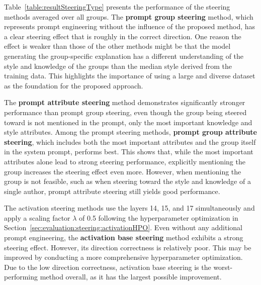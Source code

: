 Table~\ref{table:resultSteeringType} presents the performance of the steering methods averaged over all groups. The \textbf{prompt group steering} method, which represents prompt engineering without the influence of the proposed method, has a clear steering effect that is roughly in the correct direction. One reason the effect is weaker than those of the other methods might be that the model generating the group-specific explanation has a different understanding of the style and knowledge of the groups than the median style derived from the training data. This highlights the importance of using a large and diverse dataset as the foundation for the proposed approach.

\begin{table}[ht]
  \caption[]{This table shows the performance of different steering methods using the metrics displayed in Figure~\ref{fig:steeringMetrics}. The possible steering effect is not used in this experiment, because it would be the same for all methods as the values are averages over all groups. The experiment demonstrates that mentioning the attributes in the system prompt improves steering performance significantly. %
    Additionally, the experiment demonstrates that the newly proposed activation-based steering methods (see Section~\ref{sec:approach:steering:activation}) lead to a clear improvement over prompt engineering techniques.}%
  \label{table:resultSteeringType}
  \centering
  \resultSteeringType{}%
\end{table}

The \textbf{prompt attribute steering} method demonstrates significantly stronger performance than prompt group steering, even though the group being steered toward is not mentioned in the prompt, only the most important knowledge and style attributes. Among the prompt steering methods, \textbf{prompt group attribute steering}, which includes both the most important attributes and the group itself in the system prompt, performs best. This shows that, while the most important attributes alone lead to strong steering performance, explicitly mentioning the group increases the steering effect even more. However, when mentioning the group is not feasible, such as when steering toward the style and knowledge of a single author, prompt attribute steering still yields good performance.

The activation steering methods use the layers \num{14}, \num{15}, and \num{17} simultaneously and apply a scaling factor \(\lambda\) of \num{0.5} following the hyperparameter optimization in Section~\ref{sec:evaluation:steering:activationHPO}. Even without any additional prompt engineering, the \textbf{activation base steering} method exhibits a strong steering effect. However, its direction correctness is relatively poor. This may be improved by conducting a more comprehensive hyperparameter optimization. Due to the low direction correctness, activation base steering is the worst-performing method overall, as it has the largest possible improvement.

